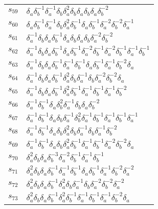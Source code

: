 \documentclass{article}
\begin{document}
\begin{center}
\begin{tabular}{ll}
$s_{59}$ & $\delta_a^{}\delta_b^{-1}\delta_a^{-1}\delta_b^{}\delta_a^{2}\delta_b^{}\delta_a^{}\delta_b^{}\delta_a^{}\delta_b^{-2}$ \\
$s_{60}$ & $\delta_a^{}\delta_b^{-1}\delta_a^{-1}\delta_b^{}\delta_a^{2}\delta_b^{-1}\delta_a^{}\delta_b^{-1}\delta_a^{-2}\delta_b^{-2}\delta_a^{-1}$ \\
$s_{61}$ & $\delta_a^{-1}\delta_b^{}\delta_a^{}\delta_b^{-1}\delta_a^{}\delta_b^{}\delta_a^{}\delta_b^{}\delta_a^{-2}\delta_b^{-2}$ \\
$s_{62}$ & $\delta_a^{-1}\delta_b^{}\delta_a^{}\delta_b^{-1}\delta_a^{}\delta_b^{-1}\delta_a^{-2}\delta_b^{-1}\delta_a^{-2}\delta_b^{-1}\delta_a^{-1}\delta_b^{-1}$ \\
$s_{63}$ & $\delta_a^{-1}\delta_b^{}\delta_a^{}\delta_b^{-1}\delta_a^{-1}\delta_b^{-1}\delta_a^{}\delta_b^{-1}\delta_a^{-1}\delta_b^{-2}\delta_a^{}$ \\
$s_{64}$ & $\delta_a^{-1}\delta_b^{}\delta_a^{}\delta_b^{-1}\delta_a^{2}\delta_b^{}\delta_a^{-1}\delta_b^{}\delta_a^{-2}\delta_b^{-2}\delta_a^{}$ \\
$s_{65}$ & $\delta_a^{-1}\delta_b^{}\delta_a^{}\delta_b^{-1}\delta_a^{2}\delta_b^{-1}\delta_a^{-1}\delta_b^{-1}\delta_a^{-1}\delta_b^{-2}$ \\
$s_{66}$ & $\delta_a^{-1}\delta_b^{-1}\delta_a^{}\delta_b^{2}\delta_a^{-1}\delta_b^{}\delta_a^{}\delta_b^{-2}$ \\
$s_{67}$ & $\delta_a^{-1}\delta_b^{-1}\delta_a^{}\delta_b^{}\delta_a^{-1}\delta_b^{2}\delta_a^{-1}\delta_b^{-1}\delta_a^{-1}\delta_b^{-1}\delta_a^{-1}$ \\
$s_{68}$ & $\delta_a^{-1}\delta_b^{-1}\delta_a^{}\delta_b^{}\delta_a^{2}\delta_b^{}\delta_a^{-1}\delta_b^{}\delta_a^{-1}\delta_b^{-2}$ \\
$s_{69}$ & $\delta_a^{-1}\delta_b^{-1}\delta_a^{}\delta_b^{}\delta_a^{2}\delta_b^{-1}\delta_a^{-1}\delta_b^{-1}\delta_a^{-2}\delta_b^{-2}\delta_a^{}$ \\
$s_{70}$ & $\delta_a^{2}\delta_b^{}\delta_a^{}\delta_b^{-3}\delta_a^{-2}\delta_b^{-1}\delta_a^{-1}\delta_b^{-1}$ \\
$s_{71}$ & $\delta_a^{2}\delta_b^{}\delta_a^{}\delta_b^{-1}\delta_a^{-1}\delta_b^{-1}\delta_a^{}\delta_b^{-1}\delta_a^{-1}\delta_b^{-2}\delta_a^{-2}$ \\
$s_{72}$ & $\delta_a^{2}\delta_b^{}\delta_a^{}\delta_b^{-1}\delta_a^{2}\delta_b^{}\delta_a^{-1}\delta_b^{}\delta_a^{-2}\delta_b^{-2}\delta_a^{-2}$ \\
$s_{73}$ & $\delta_a^{2}\delta_b^{}\delta_a^{}\delta_b^{-1}\delta_a^{2}\delta_b^{-1}\delta_a^{-1}\delta_b^{-1}\delta_a^{-1}\delta_b^{-2}\delta_a^{}$ \\

\end{tabular}
\end{center}
\end{document}
